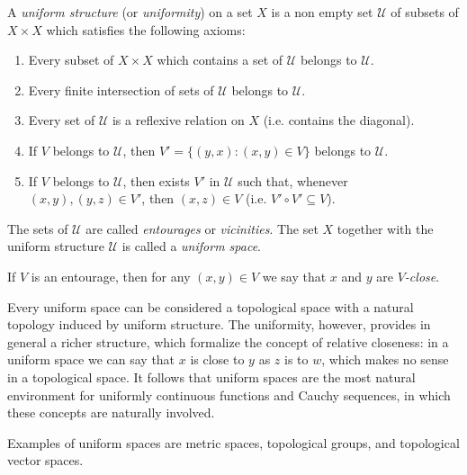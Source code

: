 \documentclass[12pt]{article}
\begin{document}
A \emph{uniform structure} (or \emph{uniformity}) on a set $X$ is a non empty set $\mathcal{U}$ of subsets of $X \times X$ which satisfies the following axioms:
\begin{enumerate}
\item Every subset of $X\times X$ which contains a set of $\mathcal{U}$ belongs to $\mathcal{U}$.
\item Every finite intersection of sets of $\mathcal{U}$ belongs to $\mathcal{U}$.
\item Every set of $\mathcal{U}$ is a reflexive relation on $X$ (i.e. contains the diagonal).
\item If $V$ belongs to $\mathcal{U}$, then $V' = \{(y,x): (x,y) \in V\}$ belongs to $\mathcal{U}$.
\item If $V$ belongs to $\mathcal{U}$, then exists $V'$ in $\mathcal{U}$ such that, whenever $(x,y),(y,z) \in V'$, then $(x,z) \in V$ (i.e. $V'\circ V'\subseteq V$).
\end{enumerate}

The sets of $\mathcal{U}$ are called \emph{entourages} or \emph{vicinities}. The set $X$ together with the uniform structure $\mathcal{U}$ is called a \emph{uniform space}.

If $V$ is an entourage, then for any $(x,y)\in V$ we say that $x$ and $y$ are \emph{$V$-close}.

Every uniform space can be considered a topological space with a natural topology induced by uniform structure. The uniformity, however, provides in general a richer structure, which formalize the concept of relative closeness: in a uniform space we can say that $x$ is close to $y$ as $z$ is to $w$, which makes no sense in a topological space. It follows that uniform spaces are the most natural environment for uniformly continuous functions and Cauchy sequences, in which these concepts are naturally involved.

Examples of uniform spaces are metric spaces, topological groups, and topological vector spaces.
\end{document}
